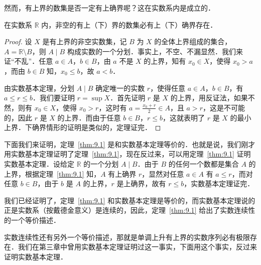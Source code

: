 然而，有上界的数集是否一定有上确界呢？这在实数系内是成立的．

\begin{theorem}[确界定理]\label{thm:9.1}
在实数系 $\mathbb{R}$ 内，非空的有上（下）界的数集必有上（下）确界存在．
\end{theorem}

\begin{proof}
设 $X$ 是有上界的非空实数集，记 $B$ 为 $X$ 的全体上界组成的集合，$A = \mathbb{R} \setminus B$，则 $A \mid B$ 构成实数的一个分划．事实上，不空、不漏显然．我们来证“不乱”．任意 $a \in A$，$b \in B$，由 $a$ 不是 $X$ 的上界，知有 $x_0 \in X$，使得 $x_0 > a$，而由 $b \in B$ 知，$x_0 \leqslant b$，故 $a < b$．

由实数基本定理，分划 $A \mid B$ 确定唯一的实数 $r$，使得任意 $a \in A$，$b \in B$，有 $a \leqslant r \leqslant b$．我们要证明 $r = \sup X$．首先证明 $r$ 是 $X$ 的上界，用反证法，如果不然，则有 $x_0 \in X$，使得 $x_0 > r$，这时有 $a = \frac{x_0 + r}{2} \in A$，且 $a > r$，这是不可能的，因此 $r$ 是 $X$ 的上界．而由于任意 $b \in B$，$r \leqslant b$，这就表明了 $r$ 是 $X$ 的最小上界．下确界情形的证明是类似的，定理证完．
\end{proof}

下面我们来证明，定理~\ref{thm:9.1} 是和实数基本定理等价的．也就是说，我们刚才用实数基本定理证明了定理~\ref{thm:9.1}，现在反过来，可以用定理~\ref{thm:9.1} 证明实数基本定理．设给定 $\mathbb{R}$ 的一个分划 $A \mid B$．由于 $B$ 的任何一个数都是集合 $A$ 的上界，根据定理~\ref{thm:9.1} 知，$A$ 有上确界 $r$，显然对任意 $a \in A$ 有 $a \leqslant r$，而对任意 $b \in B$，由于 $b$ 是 $A$ 的上界，$r$ 是上确界，故有 $r \leqslant b$，实数基本定理证完．

我们已经证明了，定理~\ref{thm:9.1} 和实数基本定理是等价的，而实数基本定理说的正是实数系（按戴德金意义）是连续的，因此，定理~\ref{thm:9.1} 给出了实数连续性的一个等价描述．

实数连续性还有另外一个等价描述，那就是单调上升有上界的实数序列必有极限存在．我们在第三章中曾用实数基本定理证明过这一事实，下面用这个事实，反过来证明实数基本定理．

